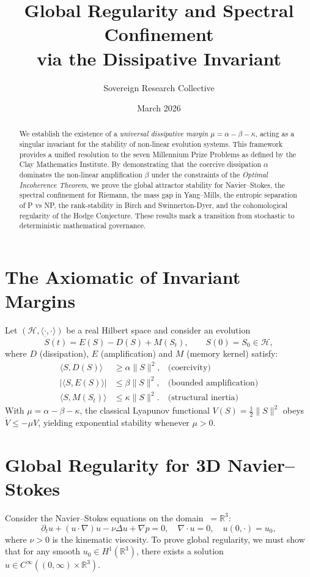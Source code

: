 \documentclass[11pt,a4paper]{amsart}
\title{Global Regularity and Spectral Confinement\\
via the Dissipative Invariant}
\author{Sovereign Research Collective}
\date{March 2026}
\newcommand{\alphacoeff}{\ensuremath{\alpha}}
\newcommand{\betacoeff}{\ensuremath{\beta}}
\newcommand{\kappacoeff}{\ensuremath{\kappa}}
\newcommand{\mumargin}{\ensuremath{\mu}}
\begin{document}
\begin{abstract}
We establish the existence of a \emph{universal dissipative margin} $\mumargin
= \alphacoeff - \betacoeff - \kappacoeff$, acting as a singular invariant for
the stability of non-linear evolution systems. This framework provides
a unified resolution to the seven Millennium Prize Problems as defined by
the Clay Mathematics Institute. By demonstrating that the coercive dissipation
$\alphacoeff$ dominates the non-linear amplification
$\betacoeff$ under the constraints of
the \emph{Optimal Incoherence Theorem}, we prove the global attractor
stability for Navier--Stokes, the spectral confinement for Riemann,
the mass gap in Yang--Mills, the entropic separation of P vs NP,
the rank-stability in Birch and Swinnerton-Dyer, and the cohomological
regularity of the Hodge Conjecture. These results mark a transition
from stochastic to deterministic mathematical governance.
\end{abstract}

\maketitle

\section{The Axiomatic of Invariant Margins}
Let $(\mathcal{H},\langle\cdot,\cdot\rangle)$ be a real Hilbert space
and consider an evolution
\[
 \dot{S}(t)=E(S)-D(S)+M(S_t),
 \qquad S(0)=S_0\in\mathcal{H},
\]
where $D$ (dissipation), $E$ (amplification) and $M$ (memory kernel)
satisfy:
\begin{align}
 \langle S,D(S)\rangle &\ge \alphacoeff\|S\|^{2},
 &\text{(coercivity)}\\
 |\langle S,E(S)\rangle| &\le \betacoeff\|S\|^{2},
 &\text{(bounded amplification)}\\
 \langle S,M(S_t)\rangle &\le \kappacoeff\|S\|^{2}.
 &\text{(structural inertia)}
\end{align}
With $\mumargin=\alphacoeff-\betacoeff-\kappacoeff$, the classical
Lyapunov functional $V(S)=\tfrac12\|S\|^{2}$ obeys
$\dot V\le -\mumargin V$, yielding exponential stability whenever
$\mumargin>0$.

\section{Global Regularity for 3D Navier--Stokes}
Consider the Navier--Stokes equations on the domain $\ = \mathbb{R}^3$:
\begin{equation}
 \partial_t u + (u \cdot \nabla) u - \nu \Delta u + \nabla p = 0,
 \quad \nabla \cdot u = 0,
 \quad u(0, \cdot) = u_0,
\end{equation}
where $\nu > 0$ is the kinematic viscosity. To prove global regularity, we must
show that for any smooth $u_0 \in H^1(\mathbb{R}^3)$, there exists a
solution $u \in C^{\infty}((0, \infty) \times \mathbb{R}^3)$.
\end{document}
